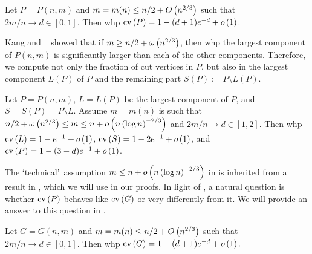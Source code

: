 \begin{thm}\label{thm:planar_sub}
Let $P=P(n,m)$ and $m=m(n)\leq n/2+O\left(n^{2/3}\right)$ such that $2m/n \to d\in[0,1]$. Then whp $\operatorname{cv}\left(P\right)=1-(d+1)e^{-d}+o\left(1\right)$.
\end{thm}
	
Kang and \Luczak\ \cite{KangLuczak2012} showed that if $m\geq n/2+\omega\left(n^{2/3}\right)$, then whp the largest component of $P(n,m)$ is significantly larger than each of the other components. Therefore, we compute not only the fraction of cut vertices in $P$, but also in the largest component $L(P)$ of $P$ and the remaining part $S(P):=P\setminus L(P)$.
\begin{thm}\label{thm:planar_sup}
Let $P=P(n,m)$, $L=L(P)$ be the largest component of $P$, and $S=S(P)=P\setminus L$. Assume $m=m(n)$ is such that $n/2+\omega\left(n^{2/3}\right)\leq m \leq n+o\left(n\left(\log n\right)^{-2/3}\right)$ and $2m/n \to d\in[1,2]$. Then whp $\operatorname{cv}\left(L\right)=1-e^{-1}+o\left(1\right)$, $\operatorname{cv}\left(S\right)=1-2e^{-1}+o\left(1\right)$, and $\operatorname{cv}\left(P\right)=1-(3-d)e^{-1}+o\left(1\right)$.
\end{thm}
	
The \lq technical\rq\ assumption $m \leq n+o\left(n\left(\log n\right)^{-2/3}\right)$ in  is inherited from a result in \cite{KangMosshammerSpruessel2020}, which we will use in our proofs. In light of , a natural question  is whether $\operatorname{cv}\left(P\right)$ behaves like $\operatorname{cv}\left(G\right)$ or very differently from it. We will provide an answer to this question in .
	
\begin{thm}\label{thm:er_sub}
Let $G=G(n,m)$ and $m=m(n)\leq n/2+O\left(n^{2/3}\right)$ such that $2m/n \to d\in[0,1]$. Then whp $\operatorname{cv}\left(G\right)=1-(d+1)e^{-d}+o\left(1\right).$	
\end{thm}
	
